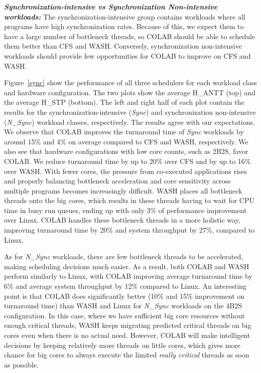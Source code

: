 \textbf{\textit{Synchronization-intensive vs Synchronization Non-intensive workloads:}}
The synchronization-intensive group contains workloads where all programs have high synchronization rates. Because of this, we expect them to have a large number of bottleneck threads, so COLAB should be able to schedule them better than CFS and WASH. Conversely, synchronization non-intensive workloads should provide few opportunities for COLAB to improve on CFS and WASH.

Figure~\ref{sync} show the performance of all three schedulers for each workload class and hardware configuration. The two plots show the 
average H\_ANTT (top) and the average H\_STP (bottom). The left and right half of each plot contain the results for the synchronization-intensive (\emph{Sync}) and synchronization non-intensive (\emph{N\_Sync}) workload classes, respectively.
The results agree with our expectations. We observe that COLAB improves the turnaround time of \emph{Sync} workloads by around 15\% and 4\% on average compared to CFS and WASH, respectively. We also see that hardware configurations with low core counts, such as 2B2S, favor COLAB. We reduce turnaround time by up to 20\% over CFS and by up to 16\% over WASH. With fewer cores, the pressure from co-executed applications rises and properly balancing bottleneck acceleration and core sensitivity across multiple programs becomes increasingly difficult. WASH places all bottleneck threads onto the big cores, which results in these threads having to wait for CPU time in busy run queues, ending up with only 3\% of performance improvement over Linux. COLAB handles these bottleneck threads in a more holistic way, improving turnaround time by 20\% and system throughput by 27\%, compared to Linux.

As for \emph{N\_Sync} workloads, there are few bottleneck threads to be accelerated, making scheduling decisions much easier. As a result, both COLAB and WASH perform similarly to Linux, with COLAB improving average turnaround time by 6\% and average system throughput by 12\% compared to Linux.
An interesting point is that COLAB does significantly better (10\% and 15\% improvement on turnaround time) than WASH and Linux for \emph{N\_Sync} workloads on the 4B2S configuration. In this case, where we have sufficient big core resources without enough critical threads, WASH keeps migrating predicted critical threads on big cores even when there is no actual need. However, COLAB will make intelligent decisions by keeping relatively more threads on little cores, which gives more chance for big cores to always execute the limited \emph{really critical} threads as soon as possible.

